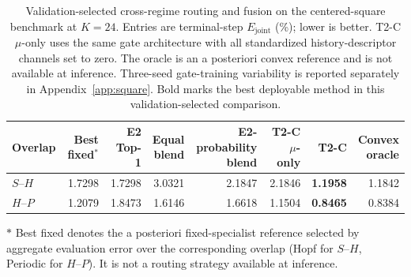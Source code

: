\documentclass{article}
\begin{document}
\par
\begin{table}[H]
\centering
\caption{
Validation-selected cross-regime routing and fusion on the centered-square benchmark at $K=24$. Entries are terminal-step $E_{\mathrm{joint}}$ (\%); lower is better. T2-C $\mu$-only uses the same gate architecture with all standardized history-descriptor channels set to zero. The oracle is an a posteriori convex reference and is not available at inference. Three-seed gate-training variability is reported separately in
Appendix~\ref{app:square}. Bold marks the best deployable method in this validation-selected comparison.
}
\label{tab:routing_fusion}
\small
\setlength{\tabcolsep}{3.5pt}
\begin{threeparttable}
\begin{tabular}{@{}lrrrrrrr@{}}
\toprule
Overlap & Best fixed$^\ast$ & E2 Top-1 & \shortstack{Equal\\blend} & \shortstack{E2-probability\\blend} & \shortstack{T2-C\\$\mu$-only} & T2-C & \shortstack{Convex\\oracle}\\
\midrule
$S$--$H$ & 1.7298 & 1.7298 & 3.0321 & 2.1847 & 2.1846 & \textbf{1.1958} & 1.1842 \\
$H$--$P$ & 1.2079 & 1.8473 & 1.6146 & 1.6618 & 1.1504 & \textbf{0.8465} & 0.8384 \\
\bottomrule
\end{tabular}
\begin{tablenotes}[flushleft]
\footnotesize
\item[$\ast$] Best fixed denotes the a posteriori fixed-specialist reference selected by aggregate evaluation error over the corresponding overlap (Hopf for $S$--$H$, Periodic for $H$--$P$). It is not a routing strategy available at inference.
\end{tablenotes}
\end{threeparttable}
\end{table}
\par
\end{document}
